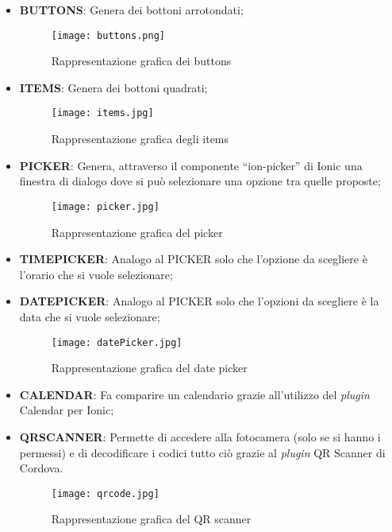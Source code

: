 \begin{itemize}
	\item \textbf{BUTTONS}: Genera dei bottoni arrotondati;
	\begin{figure}[h]
		\centering
		\texttt{[image: buttons.png]}
	\caption{Rappresentazione grafica dei buttons}
	\end{figure}
	\item \textbf{ITEMS}: Genera dei bottoni quadrati;
	\begin{figure}[h]
		\centering
		\texttt{[image: items.jpg]}
		\caption{Rappresentazione grafica degli items}
	\end{figure}
	\item \textbf{PICKER}: Genera, attraverso il componente “ion-picker” di \textsf{Ionic} una finestra di dialogo dove si può selezionare una opzione tra quelle proposte;
	\begin{figure}[h]
		\centering
		\texttt{[image: picker.jpg]}
		\caption{Rappresentazione grafica del picker}
	\end{figure}
	\item \textbf{TIMEPICKER}: Analogo al PICKER solo che l'opzione da scegliere è l'orario che si vuole selezionare;
\clearpage
	\item \textbf{DATEPICKER}: Analogo al PICKER solo che l'opzioni da scegliere è la data che si vuole selezionare;
	\begin{figure}[h]
		\centering
		\texttt{[image: datePicker.jpg]}
		\caption{Rappresentazione grafica del date picker}\label{fig:date}
	\end{figure}
	\item \textbf{CALENDAR}: Fa comparire un calendario grazie all'utilizzo del \emph{plugin} Calendar per Ionic;
	\item \textbf{QRSCANNER}: Permette di accedere alla fotocamera (solo se si hanno i permessi) e di decodificare i codici  tutto ciò grazie al \emph{plugin} QR Scanner di Cordova.
	\begin{figure}[h]
		\centering
		\texttt{[image: qrcode.jpg]}
		\caption{Rappresentazione grafica del QR scanner}\label{fig:qrc}
	\end{figure}
\end{itemize}

